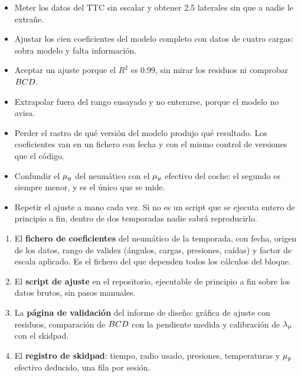 \begin{ojo}
\begin{itemize}
  \item Meter los datos del TTC sin escalar y obtener \SI{2.5}{\gacc} laterales
        sin que a nadie le extrañe.
  \item Ajustar los cien coeficientes del modelo completo con datos de cuatro
        cargas: sobra modelo y falta información.
  \item Aceptar un ajuste porque el $R^2$ es \num{0.99}, sin mirar los residuos
        ni comprobar $BCD$.
  \item Extrapolar fuera del rango ensayado y no enterarse, porque el modelo no
        avisa.
  \item Perder el rastro de qué versión del modelo produjo qué resultado. Los
        coeficientes van en un fichero con fecha y con el mismo control de
        versiones que el código.
  \item Confundir el $\mu_y$ del neumático con el $\mu_y$ efectivo del coche: el
        segundo es siempre menor, y es el único que se mide.
  \item Repetir el ajuste a mano cada vez. Si no es un script que se ejecuta
        entero de principio a fin, dentro de dos temporadas nadie sabrá
        reproducirlo.
\end{itemize}
\end{ojo}

\begin{entregable}
\begin{enumerate}
  \item El \textbf{fichero de coeficientes} del neumático de la temporada, con
        fecha, origen de los datos, rango de validez (ángulos, cargas, presiones,
        caídas) y factor de escala aplicado. Es el fichero del que dependen todos
        los cálculos del bloque.
  \item El \textbf{script de ajuste} en el repositorio, ejecutable de principio a
        fin sobre los datos brutos, sin pasos manuales.
  \item La \textbf{página de validación} del informe de diseño: gráfica de ajuste
        con residuos, comparación de $BCD$ con la pendiente medida y
        calibración de $\lambda_{\mu}$ con el skidpad.
  \item El \textbf{registro de skidpad}: tiempo, radio usado, presiones,
        temperaturas y $\mu_y$ efectivo deducido, una fila por sesión.
\end{enumerate}
\end{entregable}

